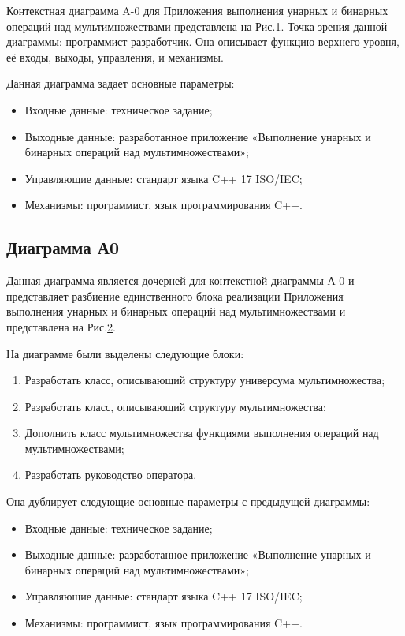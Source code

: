 \documentclass[a4paper, final]{article}
\begin{document}
\par Контекстная диаграмма A-0 для Приложения выполнения унарных и бинарных операций над мультимножествами представлена на Рис.\ref{fig1:Контекстная диаграмма А-0}. Точка зрения данной диаграммы: программист-разработчик. Она описывает функцию верхнего уровня, её входы, выходы, управления, и механизмы.
\begin{figure}[H]
	\centering
	
	\label{fig1:Контекстная диаграмма А-0}
\end{figure}

Данная диаграмма задает основные параметры:
\begin{itemize}
\item Входные данные: техническое задание;
\item Выходные данные: разработанное приложение «Выполнение унарных и бинарных операций над мультимножествами»;
\item Управляющие данные: стандарт языка C++ 17 ISO/IEC;
\item Механизмы: программист, язык программирования C++.
\end{itemize}


\newpage
\subsection{Диаграмма А0}


\par Данная диаграмма является дочерней для контекстной диаграммы А-0 и представляет разбиение единственного блока реализации Приложения выполнения унарных и бинарных операций над мультимножествами и представлена на Рис.\ref{fig2:Диаграмма А0}.
\begin{figure}[H]
	\centering
	
	\label{fig2:Диаграмма А0}
\end{figure}
\par На диаграмме были выделены следующие блоки:
\begin{enumerate}
\item Разработать класс, описывающий структуру универсума мультимножества;
\item Разработать класс, описывающий структуру мультимножества;
\item Дополнить класс мультимножества функциями выполнения операций над мультимножествами;
\item Разработать руководство оператора.
\end{enumerate}
Она дублирует следующие основные параметры с предыдущей диаграммы:
\begin{itemize}
\item Входные данные: техническое задание;
\item Выходные данные: разработанное приложение «Выполнение унарных и бинарных операций над мультимножествами»;
\item Управляющие данные: стандарт языка C++ 17 ISO/IEC;
\item Механизмы: программист, язык программирования C++.
\end{itemize}
\end{document}
